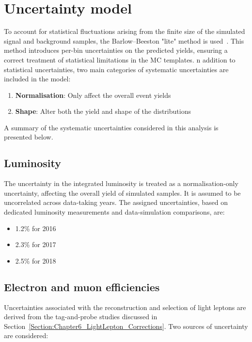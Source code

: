 \section{Uncertainty model}
\label{Section:Chapter6_Uncertainty_Model}

To account for statistical fluctuations arising from the finite size of the simulated signal and background samples, the Barlow–Beeston "lite" method is used~\cite{BARLOW1993219,Conway:2011in}. This method introduces per-bin uncertainties on the predicted yields, ensuring a correct treatment of statistical limitations in the MC templates. n addition to statistical uncertainties, two main categories of systematic uncertainties are included in the model: 

\begin{enumerate}[label=(\roman*)]

\item \textbf{Normalisation}: Only affect the overall event yields

\item \textbf{Shape}: Alter both the yield and shape of the distributions

\end{enumerate}

A summary of the systematic uncertainties considered in this analysis is presented below.

\subsection{Luminosity}

The uncertainty in the integrated luminosity is treated as a normalisation-only uncertainty, affecting the overall yield of simulated samples. It is assumed to be uncorrelated across data-taking years. The assigned uncertainties, based on dedicated luminosity measurements and data-simulation comparisons, are:

\begin{itemize}
    \item 1.2\% for 2016
    \item 2.3\% for 2017
    \item 2.5\% for 2018
\end{itemize}

\subsection{Electron and muon efficiencies}

Uncertainties associated with the reconstruction and selection of light leptons are derived from the tag-and-probe studies discussed in Section~\ref{Section:Chapter6_LightLepton_Corrections}. Two sources of uncertainty are considered:

